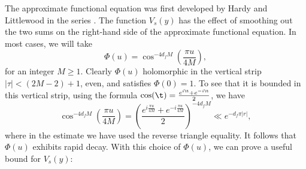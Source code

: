     The approximate functional equation was first developed by Hardy and Littlewood in the series \cite{hardyzeros1921,hardyapproximate1923,hardyapproximate1929}. The function $V_{s}(y)$ has the effect of smoothing out the two sums on the right-hand side of the approximate functional equation. In most cases, we will take
    \[
      \Phi(u) = \cos^{-4d_{f}M}\left(\frac{\pi u}{4M}\right),
    \]
    for an integer $M \ge 1$. Clearly $\Phi(u)$ holomorphic in the vertical strip $|\tau| < (2M-2)+1$, even, and satisfies $\Phi(0) = 1$. To see that it is bounded in this vertical strip, using the formula $\cos(\t) = \frac{e^{i\t}+e^{-i\t}}{2}$, we have
    \begin{equation}\label{equ:choice_for_V_decay_estimate}
     \cos^{-4d_{f}M}\left(\frac{\pi u}{4M}\right) = \left(\frac{e^{i\frac{\pi u}{4M}}+e^{-i\frac{\pi u}{4M}}}{2}\right)^{-4d_{f}M} \ll e^{-d_{f}\pi|r|},
    \end{equation}
    where in the estimate we have used the reverse triangle equality. It follows that $\Phi(u)$ exhibits rapid decay. With this choice of $ \Phi(u)$, we can prove a useful bound for $V_{s}(y)$:

